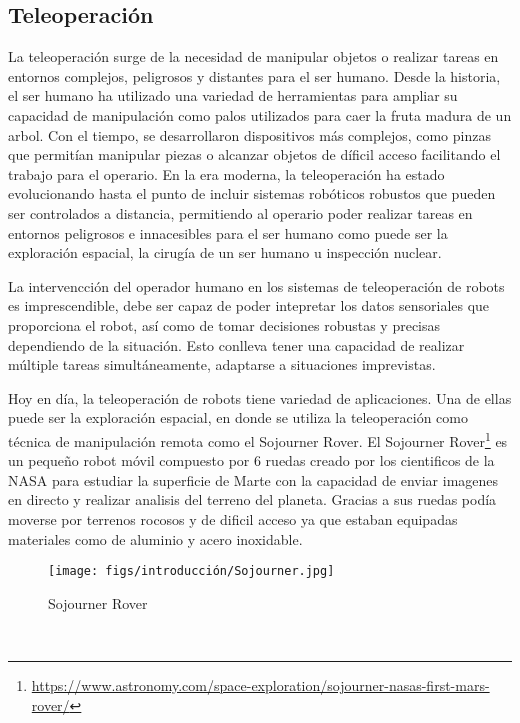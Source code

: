 \subsection{Teleoperación}
\label{sec:subseccion}

La teleoperación surge de la necesidad de manipular objetos o realizar tareas en entornos complejos, peligrosos y distantes para el ser humano. Desde la historia, el ser humano
ha utilizado una variedad de herramientas para ampliar su capacidad de manipulación como palos utilizados para caer la fruta madura de un arbol. Con el tiempo, se desarrollaron 
dispositivos más complejos, como pinzas que permitían manipular piezas o alcanzar objetos de díficil acceso facilitando el trabajo para el operario. En la era moderna, la teleoperación
ha estado evolucionando hasta el punto de incluir sistemas robóticos robustos que pueden ser controlados a distancia, permitiendo al operario poder realizar
tareas en entornos peligrosos e innacesibles para el ser humano como puede ser la exploración espacial, la cirugía de un ser humano u inspección nuclear. \newline

La intervencción del operador humano en los sistemas de teleoperación de robots es imprescendible, debe ser capaz de poder intepretar los datos sensoriales que proporciona el robot, así como de 
tomar decisiones robustas y precisas dependiendo de la situación. Esto conlleva tener una capacidad de realizar múltiple tareas simultáneamente, adaptarse a situaciones imprevistas. \newline

Hoy en día, la teleoperación de robots tiene variedad de aplicaciones. Una de ellas puede ser la exploración espacial, en donde se utiliza la teleoperación
como técnica de manipulación remota como el Sojourner Rover. El Sojourner Rover\footnote{\url{https://www.astronomy.com/space-exploration/sojourner-nasas-first-mars-rover/}} 
es un pequeño robot móvil compuesto por 6 ruedas creado por los cientificos de la NASA para estudiar 
la superficie de Marte con la capacidad de enviar imagenes en directo y realizar analisis del terreno del planeta. Gracias a sus ruedas podía moverse por terrenos rocosos y de dificil acceso
ya que estaban equipadas materiales como de aluminio y acero inoxidable. \newline

\begin{figure} [H]
  \begin{center}
    \texttt{[image: figs/introducción/Sojourner.jpg]}
  \end{center}
  \caption{Sojourner Rover}
  \label{fig:Sojourner}
\end{figure}\

